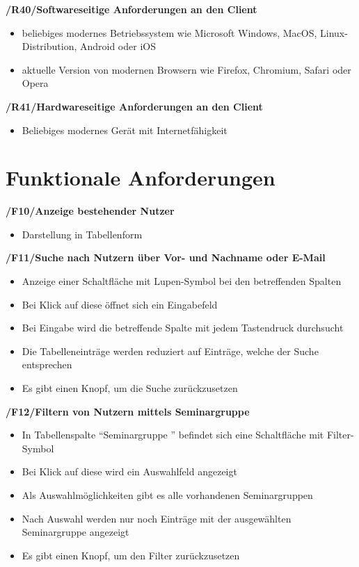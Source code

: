 \documentclass[12pt, a4paper]{scrartcl}
\newcommand{\ford}[2]{\textbf{/#1/\hspace{2em}#2}}
\begin{document}
\ford{R40}{Softwareseitige Anforderungen an den Client}
\begin{itemize}
	\item beliebiges modernes Betriebssystem wie Microsoft Windows, MacOS, Linux-Distribution, Android oder iOS
	\item aktuelle Version von modernen Browsern wie Firefox, Chromium, Safari oder Opera
\end{itemize}

\ford{R41}{Hardwareseitige Anforderungen an den Client}
\begin{itemize}
	\item Beliebiges modernes Gerät mit Internetfähigkeit
\end{itemize}
\newpage

\section{Funktionale Anforderungen}
\ford{F10}{Anzeige bestehender Nutzer}
\begin{itemize}
	\item Darstellung in Tabellenform
\end{itemize}

\ford{F11}{Suche nach Nutzern über Vor- und Nachname oder E-Mail}
\begin{itemize}
	\item Anzeige einer Schaltfläche mit Lupen-Symbol bei den betreffenden Spalten
	\item Bei Klick auf diese öffnet sich ein Eingabefeld
	\item Bei Eingabe wird die betreffende Spalte mit jedem Tastendruck durchsucht
	\item Die Tabelleneinträge werden reduziert auf Einträge, welche der Suche entsprechen
	\item Es gibt einen Knopf, um die Suche zurückzusetzen
\end{itemize}

\ford{F12}{Filtern von Nutzern mittels Seminargruppe}
\begin{itemize}
	\item In Tabellenspalte "`Seminargruppe "' befindet sich eine Schaltfläche mit Filter-Symbol
	\item Bei Klick auf diese wird ein Auswahlfeld angezeigt
	\item Als Auswahlmöglichkeiten gibt es alle vorhandenen Seminargruppen
	\item Nach Auswahl werden nur noch Einträge mit der ausgewählten Seminargruppe angezeigt
	\item Es gibt einen Knopf, um den Filter zurückzusetzen
\end{itemize}
\end{document}
